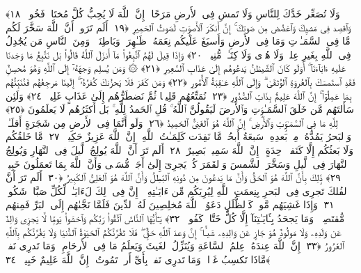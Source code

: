  وَلَا تُصَعِّر خَدَّكَ لِلنَّاسِ وَلَا تَمشِ فِى ٱلأَرضِ مَرَحًا ۖ إِنَّ ٱللَّهَ لَا يُحِبُّ كُلَّ مُختَالٍۢ فَخُورٍۢ ﴿١٨﴾
 وَٱقصِد فِى مَشيِكَ وَٱغضُض مِن صَوتِكَ ۚ إِنَّ أَنكَرَ ٱلأَصوَٟتِ لَصَوتُ ٱلحَمِيرِ ﴿١٩﴾
 أَلَم تَرَوا۟ أَنَّ ٱللَّهَ سَخَّرَ لَكُم مَّا فِى ٱلسَّمَـٰوَٟتِ وَمَا فِى ٱلأَرضِ وَأَسبَغَ عَلَيكُم نِعَمَهُۥ ظَـٰهِرَةًۭ وَبَاطِنَةًۭ ۗ وَمِنَ ٱلنَّاسِ مَن يُجَٰدِلُ فِى ٱللَّهِ بِغَيرِ عِلمٍۢ وَلَا هُدًۭى وَلَا كِتَـٰبٍۢ مُّنِيرٍۢ ﴿٢٠﴾
 وَإِذَا قِيلَ لَهُمُ ٱتَّبِعُوا۟ مَآ أَنزَلَ ٱللَّهُ قَالُوا۟ بَل نَتَّبِعُ مَا وَجَدنَا عَلَيهِ ءَابَآءَنَآ ۚ أَوَلَو كَانَ ٱلشَّيطَٰنُ يَدعُوهُم إِلَىٰ عَذَابِ ٱلسَّعِيرِ ﴿٢١﴾
 ۞ وَمَن يُسلِم وَجهَهُۥٓ إِلَى ٱللَّهِ وَهُوَ مُحسِنٌۭ فَقَدِ ٱستَمسَكَ بِٱلعُروَةِ ٱلوُثقَىٰ ۗ وَإِلَى ٱللَّهِ عَـٰقِبَةُ ٱلأُمُورِ ﴿٢٢﴾
 وَمَن كَفَرَ فَلَا يَحزُنكَ كُفرُهُۥٓ ۚ إِلَينَا مَرجِعُهُم فَنُنَبِّئُهُم بِمَا عَمِلُوٓا۟ ۚ إِنَّ ٱللَّهَ عَلِيمٌۢ بِذَاتِ ٱلصُّدُورِ ﴿٢٣﴾
 نُمَتِّعُهُم قَلِيلًۭا ثُمَّ نَضطَرُّهُم إِلَىٰ عَذَابٍ غَلِيظٍۢ ﴿٢٤﴾
 وَلَئِن سَأَلتَهُم مَّن خَلَقَ ٱلسَّمَـٰوَٟتِ وَٱلأَرضَ لَيَقُولُنَّ ٱللَّهُ ۚ قُلِ ٱلحَمدُ لِلَّهِ ۚ بَل أَكثَرُهُم لَا يَعلَمُونَ ﴿٢٥﴾
 لِلَّهِ مَا فِى ٱلسَّمَـٰوَٟتِ وَٱلأَرضِ ۚ إِنَّ ٱللَّهَ هُوَ ٱلغَنِىُّ ٱلحَمِيدُ ﴿٢٦﴾
 وَلَو أَنَّمَا فِى ٱلأَرضِ مِن شَجَرَةٍ أَقلَـٰمٌۭ وَٱلبَحرُ يَمُدُّهُۥ مِنۢ بَعدِهِۦ سَبعَةُ أَبحُرٍۢ مَّا نَفِدَت كَلِمَـٰتُ ٱللَّهِ ۗ إِنَّ ٱللَّهَ عَزِيزٌ حَكِيمٌۭ ﴿٢٧﴾
 مَّا خَلقُكُم وَلَا بَعثُكُم إِلَّا كَنَفسٍۢ وَٟحِدَةٍ ۗ إِنَّ ٱللَّهَ سَمِيعٌۢ بَصِيرٌ ﴿٢٨﴾
 أَلَم تَرَ أَنَّ ٱللَّهَ يُولِجُ ٱلَّيلَ فِى ٱلنَّهَارِ وَيُولِجُ ٱلنَّهَارَ فِى ٱلَّيلِ وَسَخَّرَ ٱلشَّمسَ وَٱلقَمَرَ كُلٌّۭ يَجرِىٓ إِلَىٰٓ أَجَلٍۢ مُّسَمًّۭى وَأَنَّ ٱللَّهَ بِمَا تَعمَلُونَ خَبِيرٌۭ ﴿٢٩﴾
 ذَٟلِكَ بِأَنَّ ٱللَّهَ هُوَ ٱلحَقُّ وَأَنَّ مَا يَدعُونَ مِن دُونِهِ ٱلبَٰطِلُ وَأَنَّ ٱللَّهَ هُوَ ٱلعَلِىُّ ٱلكَبِيرُ ﴿٣٠﴾
 أَلَم تَرَ أَنَّ ٱلفُلكَ تَجرِى فِى ٱلبَحرِ بِنِعمَتِ ٱللَّهِ لِيُرِيَكُم مِّن ءَايَـٰتِهِۦٓ ۚ إِنَّ فِى ذَٟلِكَ لَءَايَـٰتٍۢ لِّكُلِّ صَبَّارٍۢ شَكُورٍۢ ﴿٣١﴾
 وَإِذَا غَشِيَهُم مَّوجٌۭ كَٱلظُّلَلِ دَعَوُا۟ ٱللَّهَ مُخلِصِينَ لَهُ ٱلدِّينَ فَلَمَّا نَجَّىٰهُم إِلَى ٱلبَرِّ فَمِنهُم مُّقتَصِدٌۭ ۚ وَمَا يَجحَدُ بِـَٔايَـٰتِنَآ إِلَّا كُلُّ خَتَّارٍۢ كَفُورٍۢ ﴿٣٢﴾
 يَـٰٓأَيُّهَا ٱلنَّاسُ ٱتَّقُوا۟ رَبَّكُم وَٱخشَوا۟ يَومًۭا لَّا يَجزِى وَالِدٌ عَن وَلَدِهِۦ وَلَا مَولُودٌ هُوَ جَازٍ عَن وَالِدِهِۦ شَيـًٔا ۚ إِنَّ وَعدَ ٱللَّهِ حَقٌّۭ ۖ فَلَا تَغُرَّنَّكُمُ ٱلحَيَوٰةُ ٱلدُّنيَا وَلَا يَغُرَّنَّكُم بِٱللَّهِ ٱلغَرُورُ ﴿٣٣﴾
 إِنَّ ٱللَّهَ عِندَهُۥ عِلمُ ٱلسَّاعَةِ وَيُنَزِّلُ ٱلغَيثَ وَيَعلَمُ مَا فِى ٱلأَرحَامِ ۖ وَمَا تَدرِى نَفسٌۭ مَّاذَا تَكسِبُ غَدًۭا ۖ وَمَا تَدرِى نَفسٌۢ بِأَىِّ أَرضٍۢ تَمُوتُ ۚ إِنَّ ٱللَّهَ عَلِيمٌ خَبِيرٌۢ ﴿٣٤﴾
 
